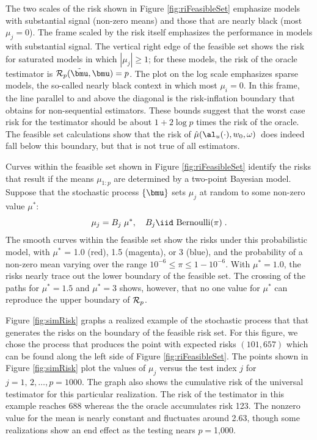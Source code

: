 \documentclass[12pt]{article}
\newcommand{\uTest}{\mbox{$\hat\mu(\al_u(\cdot),w_0,\omega)$}}
\begin{document}
 The two scales of the risk shown in Figure \ref{fig:riFeasibleSet} emphasize
 models with substantial signal (non-zero means) and those that are nearly black
 (most $\mu_j=0$).  The frame scaled by the risk itself emphasizes the
 performance in models with substantial signal.  The vertical right edge of the
 feasible set shows the risk for saturated models in which $|\mu_j| \ge 1$; for
 these models, the risk of the oracle testimator is ${\cal R}_p(\tilde{\bmu},
 \bmu) = p$.  The plot on the log scale emphasizes sparse models, the so-called
 nearly black context in which most $\mu_i = 0$.  In this frame, the line
 parallel to and above the diagonal is the risk-inflation boundary 
 that obtains for non-sequential estimators.  These bounds suggest that the
 worst case risk for the testimator should be about $1 + 2 \log p$ times the
 risk of the oracle.  The feasible set calculations show that the risk of
 \uTest\ does indeed fall below this boundary, but that is not true of all
 estimators.  


 Curves within the feasible set shown in Figure \ref{fig:riFeasibleSet}
 identify the risks that result if the means $\mu_{1:p}$ are determined by a
 two-point Bayesian model.  Suppose that the stochastic process $\{\bmu\}$ sets
 $\mu_j$ at random to some non-zero value $\mu^{*}$:
 \begin{equation}
    \mu_j = B_j \; \mu^{*}, \quad B_j  \iid \mbox{ Bernoulli}(\pi)  \;.
 \label{eq:muj}
 \end{equation}
 The smooth curves within the feasible set show the risks under this
 probabilistic model, with $\mu^{*}$ = 1.0 (red), 1.5 (magenta), or 3 (blue),
 and the probability of a non-zero mean varying over the range $10^{-6} \le \pi
 \le 1-10^{-6}$.  With $\mu^{*} = 1.0$, the risks nearly trace out the lower
 boundary of the feasible set.  The crossing of the paths for $\mu^{*}=1.5$ and
 $\mu^{*}=3$ shows, however, that no one value for $\mu^{*}$ can reproduce the
 upper boundary of ${\cal R}_p$.


 Figure \ref{fig:simRisk} graphs a realized example of the stochastic process
 that that generates the risks on the boundary of the feasible risk set.  For
 this figure, we chose the process that produces the point with expected risks
 $(101, 657)$ which can be found along the left side of Figure
 \ref{fig:riFeasibleSet}.  The points shown in Figure \ref{fig:simRisk} plot the
 values of $\mu_j$ versus the test index $j$ for $j = 1,\,2, \ldots, p=1000$.
  The graph also shows the cumulative risk of the universal testimator for this
 particular realization.  The risk of the testimator in this example reaches 688
 whereas the the oracle accumulates risk 123.  The nonzero value for the mean is
 nearly constant and fluctuates around 2.63, though some realizations show an
 end effect as the testing nears $p=$1,000.
\end{document}
